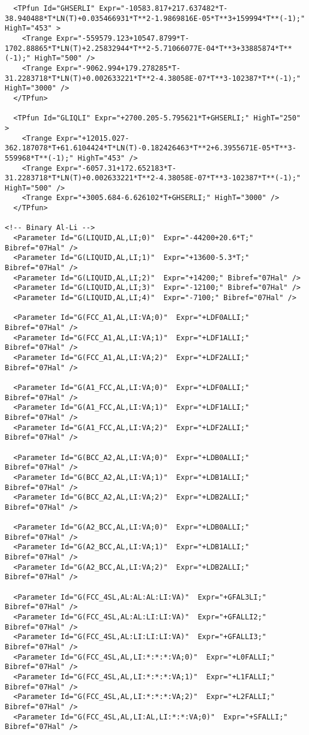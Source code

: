 \documentclass{article}
\begin{document}
\begin{appendices}
\begin{verbatim}
  <TPfun Id="GHSERLI" Expr="-10583.817+217.637482*T-38.940488*T*LN(T)+0.035466931*T**2-1.9869816E-05*T**3+159994*T**(-1);" HighT="453" >
    <Trange Expr="-559579.123+10547.8799*T-1702.88865*T*LN(T)+2.25832944*T**2-5.71066077E-04*T**3+33885874*T**(-1);" HighT="500" /> 
    <Trange Expr="-9062.994+179.278285*T-31.2283718*T*LN(T)+0.002633221*T**2-4.38058E-07*T**3-102387*T**(-1);" HighT="3000" /> 
  </TPfun>

  <TPfun Id="GLIQLI" Expr="+2700.205-5.795621*T+GHSERLI;" HighT="250" >
    <Trange Expr="+12015.027-362.187078*T+61.6104424*T*LN(T)-0.182426463*T**2+6.3955671E-05*T**3-559968*T**(-1);" HighT="453" /> 
    <Trange Expr="-6057.31+172.652183*T-31.2283718*T*LN(T)+0.002633221*T**2-4.38058E-07*T**3-102387*T**(-1);" HighT="500" /> 
    <Trange Expr="+3005.684-6.626102*T+GHSERLI;" HighT="3000" /> 
  </TPfun>

<!-- Binary Al-Li -->
  <Parameter Id="G(LIQUID,AL,LI;0)"  Expr="-44200+20.6*T;" Bibref="07Hal" />
  <Parameter Id="G(LIQUID,AL,LI;1)"  Expr="+13600-5.3*T;" Bibref="07Hal" />
  <Parameter Id="G(LIQUID,AL,LI;2)"  Expr="+14200;" Bibref="07Hal" />
  <Parameter Id="G(LIQUID,AL,LI;3)"  Expr="-12100;" Bibref="07Hal" />
  <Parameter Id="G(LIQUID,AL,LI;4)"  Expr="-7100;" Bibref="07Hal" />

  <Parameter Id="G(FCC_A1,AL,LI:VA;0)"  Expr="+LDF0ALLI;" Bibref="07Hal" />
  <Parameter Id="G(FCC_A1,AL,LI:VA;1)"  Expr="+LDF1ALLI;" Bibref="07Hal" />
  <Parameter Id="G(FCC_A1,AL,LI:VA;2)"  Expr="+LDF2ALLI;" Bibref="07Hal" />

  <Parameter Id="G(A1_FCC,AL,LI:VA;0)"  Expr="+LDF0ALLI;" Bibref="07Hal" />
  <Parameter Id="G(A1_FCC,AL,LI:VA;1)"  Expr="+LDF1ALLI;" Bibref="07Hal" />
  <Parameter Id="G(A1_FCC,AL,LI:VA;2)"  Expr="+LDF2ALLI;" Bibref="07Hal" />

  <Parameter Id="G(BCC_A2,AL,LI:VA;0)"  Expr="+LDB0ALLI;" Bibref="07Hal" />
  <Parameter Id="G(BCC_A2,AL,LI:VA;1)"  Expr="+LDB1ALLI;" Bibref="07Hal" />
  <Parameter Id="G(BCC_A2,AL,LI:VA;2)"  Expr="+LDB2ALLI;" Bibref="07Hal" />

  <Parameter Id="G(A2_BCC,AL,LI:VA;0)"  Expr="+LDB0ALLI;" Bibref="07Hal" />
  <Parameter Id="G(A2_BCC,AL,LI:VA;1)"  Expr="+LDB1ALLI;" Bibref="07Hal" />
  <Parameter Id="G(A2_BCC,AL,LI:VA;2)"  Expr="+LDB2ALLI;" Bibref="07Hal" />

  <Parameter Id="G(FCC_4SL,AL:AL:AL:LI:VA)"  Expr="+GFAL3LI;" Bibref="07Hal" />
  <Parameter Id="G(FCC_4SL,AL:AL:LI:LI:VA)"  Expr="+GFALLI2;" Bibref="07Hal" />
  <Parameter Id="G(FCC_4SL,AL:LI:LI:LI:VA)"  Expr="+GFALLI3;" Bibref="07Hal" />
  <Parameter Id="G(FCC_4SL,AL,LI:*:*:*:VA;0)"  Expr="+L0FALLI;" Bibref="07Hal" />
  <Parameter Id="G(FCC_4SL,AL,LI:*:*:*:VA;1)"  Expr="+L1FALLI;" Bibref="07Hal" />
  <Parameter Id="G(FCC_4SL,AL,LI:*:*:*:VA;2)"  Expr="+L2FALLI;" Bibref="07Hal" />
  <Parameter Id="G(FCC_4SL,AL,LI:AL,LI:*:*:VA;0)"  Expr="+SFALLI;" Bibref="07Hal" />


\end{verbatim}
\end{appendices}
\end{document}
